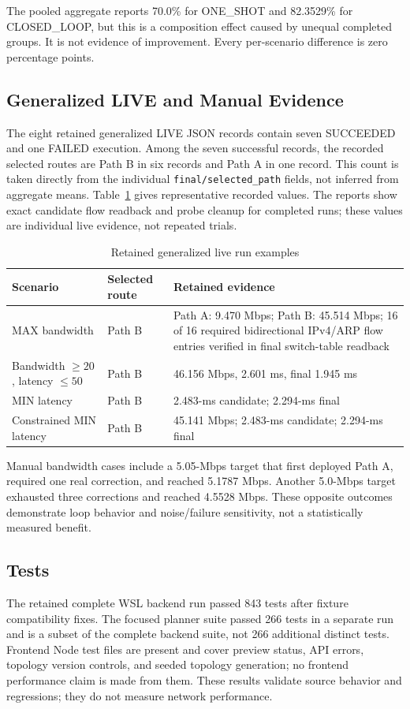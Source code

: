 \documentclass[conference]{IEEEtran}
\begin{document}
The pooled aggregate reports 70.0\% for ONE\_SHOT and 82.3529\% for
CLOSED\_LOOP, but this is a composition effect caused by unequal completed
groups. It is not evidence of improvement. Every per-scenario difference is
zero percentage points.

\subsection{Generalized LIVE and Manual Evidence}
The eight retained generalized LIVE JSON records contain seven SUCCEEDED and
one FAILED execution. Among the seven successful records, the recorded
selected routes are Path B in six records and Path A in one record. This count
is taken directly from the individual \texttt{final/selected\_path} fields,
not inferred from aggregate means. Table~\ref{tab:generalized} gives
representative recorded values. The reports show exact candidate flow
readback and probe cleanup for completed runs; these values are individual
live evidence, not repeated trials.

\begin{table}[t]
\caption{Retained generalized live run examples}
\label{tab:generalized}
\centering
\scriptsize
\begin{tabular}{p{}p{}p{}}
\toprule
Scenario & Selected route & Retained evidence\\
\midrule
MAX bandwidth & Path B & Path A: 9.470 Mbps; Path B: 45.514 Mbps;
16 of 16 required bidirectional IPv4/ARP flow entries verified in final
switch-table readback \\
Bandwidth $\ge20$, latency $\le50$ & Path B & 46.156 Mbps, 2.601 ms,
final 1.945 ms \\
MIN latency & Path B & 2.483-ms candidate; 2.294-ms final \\
Constrained MIN latency & Path B & 45.141 Mbps; 2.483-ms candidate;
2.294-ms final \\
\bottomrule
\end{tabular}
\end{table}

Manual bandwidth cases include a 5.05-Mbps target that first deployed Path A,
required one real correction, and reached 5.1787 Mbps. Another 5.0-Mbps
target exhausted three corrections and reached 4.5528 Mbps. These opposite
outcomes demonstrate loop behavior and noise/failure sensitivity, not a
statistically measured benefit.

\subsection{Tests}
The retained complete WSL backend run passed 843 tests after fixture
compatibility fixes. The focused planner suite passed 266 tests in a separate
run and is a subset of the complete backend suite, not 266 additional distinct
tests. Frontend
Node test files are present and cover preview status, API errors,
topology version controls, and seeded topology generation; no frontend
performance claim is made from them.
These results
validate source behavior and regressions; they do not measure network
performance.
\end{document}
